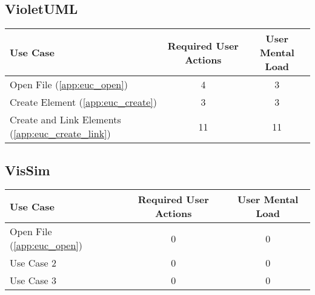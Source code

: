 \subsection*{VioletUML}




\begin{tabularx}{\textwidth}{Xcc}
\textbf{Use Case} & \textbf{Required User Actions} & \textbf{User Mental Load}\\
\hline
Open File (\ref{app:euc_open})                       & 4  & 3 \\
Create Element (\ref{app:euc_create})                & 3  & 3 \\
Create and Link Elements (\ref{app:euc_create_link}) & 11 & 11
\end{tabularx}

\subsection*{VisSim}

\begin{tabularx}{\textwidth}{Xcc}
\textbf{Use Case} & \textbf{Required User Actions} & \textbf{User Mental Load}\\
\hline
Open File (\ref{app:euc_open}) & {\color{red}0} & {\color{red}0} \\
Use Case 2                     & {\color{red}0} & {\color{red}0} \\
Use Case 3                     & {\color{red}0} & {\color{red}0}
\end{tabularx}

